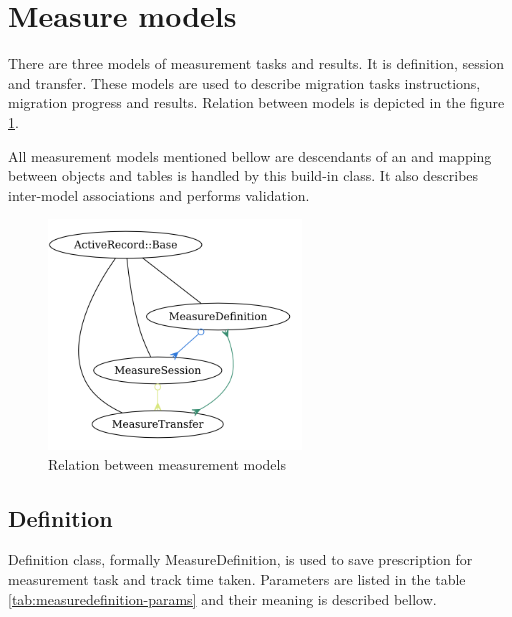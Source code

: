 \section{Measure models}
There are three models of measurement tasks and results. It is definition, session and transfer. These models are used to describe migration tasks instructions, migration progress and results. 
Relation between models is depicted in the figure \ref{img:themis-models-brief}.

All measurement models mentioned bellow are descendants of an  and mapping between objects and tables is handled by this build-in class. It also describes inter-model associations and performs validation. 

\begin{figure}[htb]
	\begin{center}
	\includegraphics[width=0.6\textwidth]{models_brief.png}
	\end{center}
	\caption{Relation between measurement models}
	\label{img:themis-models-brief}
\end{figure}


\subsection{Definition}
Definition class, formally MeasureDefinition, is used to save prescription for measurement task and track time taken. Parameters are listed in the table \ref{tab:measuredefinition-params} and their meaning is described bellow.

